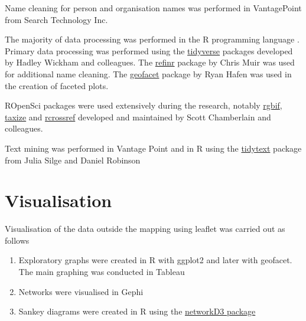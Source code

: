 \documentclass[]{book}
\theoremstyle{definition}
\theoremstyle{definition}
\theoremstyle{definition}
\theoremstyle{remark}
\begin{document}
Name cleaning for person and organisation names was performed in
VantagePoint from Search Technology Inc.

The majority of data processing was performed in the R programming
language \citep{r_core}. Primary data processing was performed using the
\href{https://github.com/tidyverse/tidyverse}{tidyverse} packages
developed by Hadley Wickham and colleagues. The
\href{https://github.com/ChrisMuir/refinr}{refinr} package by Chris Muir
was used for additional name cleaning. The
\href{https://github.com/hafen/geofacet}{geofacet} package by Ryan Hafen
was used in the creation of faceted plots.

ROpenSci packages were used extensively during the research, notably
\href{https://github.com/ropensci/rgbif}{rgbif},
\href{https://github.com/ropensci/taxize}{taxize} and
\href{https://github.com/ropensci/rcrossref}{rcrossref} developed and
maintained by Scott Chamberlain and colleagues.

Text mining was performed in Vantage Point and in R using the
\href{https://github.com/juliasilge/tidytext}{tidytext} package from
Julia Silge and Daniel Robinson \citep{Fay_2018}

\hypertarget{visualisation}{%
\section{Visualisation}\label{visualisation}}

Visualisation of the data outside the mapping using leaflet was carried
out as follows

\begin{enumerate}
\def\labelenumi{\arabic{enumi}.}
\item
  Exploratory graphs were created in R with ggplot2 and later with
  geofacet. The main graphing was conducted in Tableau
\item
  Networks were visualised in Gephi
\item
  Sankey diagrams were created in R using the
  \href{https://christophergandrud.github.io/networkD3/}{networkD3
  package}
\end{enumerate}


\end{document}
